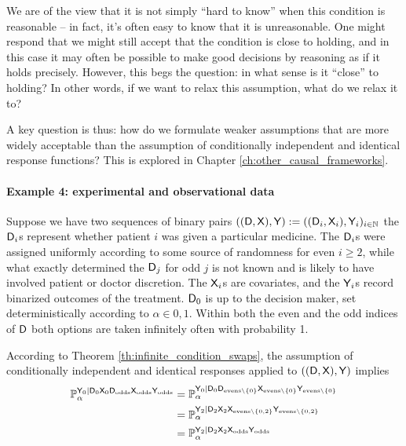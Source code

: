 We are of the view that it is not simply ``hard to know'' when this condition is reasonable -- in fact, it's often easy to know that it is unreasonable. One might respond that we might still accept that the condition is close to holding, and in this case it may often be possible to make good decisions by reasoning as if it holds precisely. However, this begs the question: in what sense is it ``close'' to holding? In other words, if we want to relax this assumption, what do we relax it to?

A key question is thus: how do we formulate weaker assumptions that are more widely acceptable than the assumption of conditionally independent and identical response functions? This is explored in Chapter \ref{ch:other_causal_frameworks}.

\paragraph{Example 4: experimental and observational data}

Suppose we have two sequences of binary pairs $((\mathsf{D},\mathsf{X}),\mathsf{Y}):=((\mathsf{D}_i,\mathsf{X}_i),\mathsf{Y}_i)_{i\in \mathbb{N}}$ the $\mathsf{D}_i$s represent whether patient $i$ was given a particular medicine. The $\mathsf{D}_i$s were assigned uniformly according to some source of randomness for even $i\geq 2$, while what exactly determined the $\mathsf{D}_j$ for odd $j$ is not known and is likely to have involved patient or doctor discretion. The $\mathsf{X}_i$s are covariates, and the $\mathsf{Y}_i$s record binarized outcomes of the treatment. $\mathsf{D}_0$ is up to the decision maker, set deterministically according to $\alpha\in 0,1$. Within both the even and the odd indices of $\mathsf{D}$ both options are taken infinitely often with probability 1.

According to Theorem \ref{th:infinite_condition_swaps}, the assumption of conditionally independent and identical responses applied to $((\mathsf{D},\mathsf{X}),\mathsf{Y})$ implies
\begin{align}
    \mathbb{P}_\alpha^{\mathsf{Y}_0|\mathsf{D}_0\mathsf{X}_0\mathsf{D}_{\text{odds}}\mathsf{X}_{\text{odds}}\mathsf{Y}_{\text{odds}}}&=\mathbb{P}_\alpha^{\mathsf{Y}_0|\mathsf{D}_0\mathsf{D}_{\text{evens}\setminus\{0\}}\mathsf{X}_{\text{evens}\setminus\{0\}}\mathsf{Y}_{\text{evens}\setminus\{0\}}}\\
    &=\mathbb{P}_\alpha^{\mathsf{Y}_2|\mathsf{D}_2\mathsf{X}_2\mathsf{X}_{\text{evens}\setminus\{0,2\}}\mathsf{Y}_{\text{evens}\setminus\{0,2\}}}\\
    &=\mathbb{P}_\alpha^{\mathsf{Y}_2|\mathsf{D}_2\mathsf{X}_2\mathsf{X}_{\text{odds}}\mathsf{Y}_{\text{odds}}}
\end{align}

